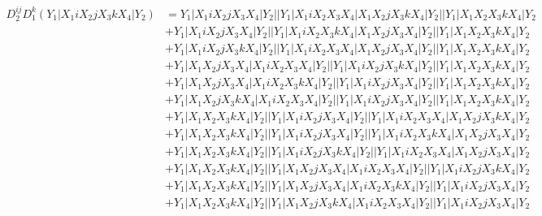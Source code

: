 \documentclass{article}[12pt]
\begin{document}
\begin{align*}
D_2^{ij}D_1^k(Y_1|X_1iX_2jX_3kX_4|Y_2)& =Y_1|X_1iX_2jX_3X_4|Y_2||Y_1|X_1iX_2X_3X_4|X_1X_2jX_3kX_4|Y_2||Y_1|X_1X_2X_3kX_4|Y_2\\ 
 & +Y_1|X_1iX_2jX_3X_4|Y_2||Y_1|X_1iX_2X_3kX_4|X_1X_2jX_3X_4|Y_2||Y_1|X_1X_2X_3kX_4|Y_2\\ 
 & +Y_1|X_1iX_2jX_3kX_4|Y_2||Y_1|X_1iX_2X_3X_4|X_1X_2jX_3X_4|Y_2||Y_1|X_1X_2X_3kX_4|Y_2\\ 
 & +Y_1|X_1X_2jX_3X_4|X_1iX_2X_3X_4|Y_2||Y_1|X_1iX_2jX_3kX_4|Y_2||Y_1|X_1X_2X_3kX_4|Y_2\\ 
 & +Y_1|X_1X_2jX_3X_4|X_1iX_2X_3kX_4|Y_2||Y_1|X_1iX_2jX_3X_4|Y_2||Y_1|X_1X_2X_3kX_4|Y_2\\ 
 & +Y_1|X_1X_2jX_3kX_4|X_1iX_2X_3X_4|Y_2||Y_1|X_1iX_2jX_3X_4|Y_2||Y_1|X_1X_2X_3kX_4|Y_2\\ 
 & +Y_1|X_1X_2X_3kX_4|Y_2||Y_1|X_1iX_2jX_3X_4|Y_2||Y_1|X_1iX_2X_3X_4|X_1X_2jX_3kX_4|Y_2\\ 
 & +Y_1|X_1X_2X_3kX_4|Y_2||Y_1|X_1iX_2jX_3X_4|Y_2||Y_1|X_1iX_2X_3kX_4|X_1X_2jX_3X_4|Y_2\\ 
 & +Y_1|X_1X_2X_3kX_4|Y_2||Y_1|X_1iX_2jX_3kX_4|Y_2||Y_1|X_1iX_2X_3X_4|X_1X_2jX_3X_4|Y_2\\ 
 & +Y_1|X_1X_2X_3kX_4|Y_2||Y_1|X_1X_2jX_3X_4|X_1iX_2X_3X_4|Y_2||Y_1|X_1iX_2jX_3kX_4|Y_2\\ 
 & +Y_1|X_1X_2X_3kX_4|Y_2||Y_1|X_1X_2jX_3X_4|X_1iX_2X_3kX_4|Y_2||Y_1|X_1iX_2jX_3X_4|Y_2\\ 
 & +Y_1|X_1X_2X_3kX_4|Y_2||Y_1|X_1X_2jX_3kX_4|X_1iX_2X_3X_4|Y_2||Y_1|X_1iX_2jX_3X_4|Y_2\end{align*}
\end{document}
